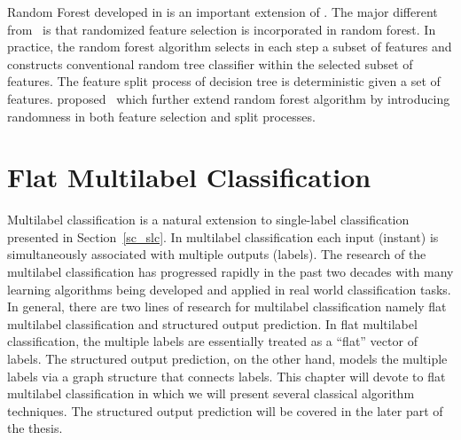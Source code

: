 {Random Forest developed in \citep{Breiman01random} is an important extension of \bagging.
The major different from \bagging\ is that randomized feature selection is incorporated in random forest.
In practice, the random forest algorithm selects in each step a subset of features and constructs conventional random tree classifier within the selected subset of features.
The feature split process of decision tree is deterministic given a set of features.
\citet{Liu08spectrum} proposed \vrtree\ which further extend random forest algorithm by introducing randomness in both feature selection and split processes.





%
%
\chapter{Flat Multilabel Classification} \label{ch_fmlc}

Multilabel classification is a natural extension to single-label classification presented in Section~\ref{sc_slc}.
In multilabel classification each input (instant) is simultaneously associated with multiple outputs (labels).
The research of the multilabel classification has progressed rapidly in the past two decades with many learning algorithms being developed and applied in real world classification tasks.
In general, there are two lines of research for multilabel classification namely flat multilabel classification and structured output prediction.
In flat multilabel classification, the multiple labels are essentially treated as a ``flat'' vector of labels.
The structured output prediction, on the other hand, models the multiple labels via a graph structure that connects labels.
This chapter will devote to flat multilabel classification in which we will present several classical algorithm techniques.
The structured output prediction will be covered in the later part of the thesis.

}
